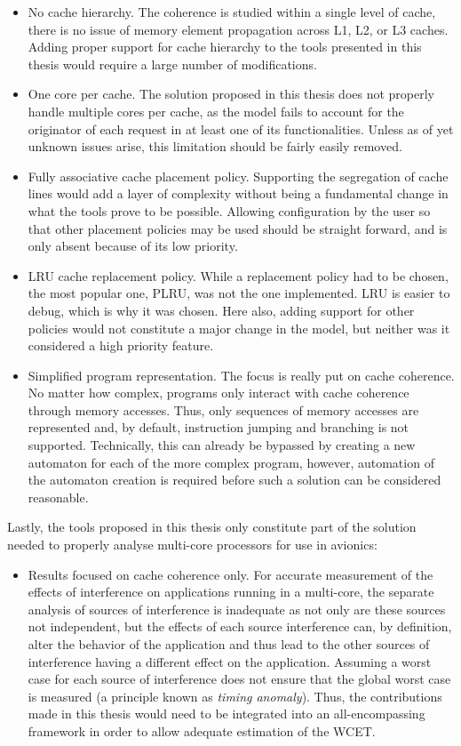 \begin{itemize}
\item No cache hierarchy. The coherence is studied within a single level of
cache, there is no issue of memory element propagation across L1, L2, or L3
caches. Adding proper support for cache hierarchy to the tools presented in this
thesis would require a large number of modifications.
\item One core per cache. The solution proposed in this thesis does not properly
handle multiple cores per cache, as the model fails to account for the
originator of each request in at least one of its functionalities. Unless as of
yet unknown issues arise, this limitation should be fairly easily removed.
\item Fully associative cache placement policy. Supporting the segregation of
cache lines would add a layer of complexity without being a fundamental change
in what the tools prove to be possible. Allowing configuration by the user so
that other placement policies may be used should be straight forward, and is
only absent because of its low priority.
\item LRU cache replacement policy. While a replacement policy had to be chosen,
the most popular one, PLRU, was not the one implemented. LRU is easier to
debug, which is why it was chosen. Here also, adding support for other policies
would not constitute a major change in the model, but neither was it considered
a high priority feature.
\item Simplified program representation. The focus is really put on cache
coherence. No matter how complex, programs only interact with cache coherence
through memory accesses. Thus, only sequences of memory accesses are represented
and, by default, instruction jumping and branching is not supported.
Technically, this can already be bypassed by creating a new automaton for each
of the more complex program, however, automation of the automaton creation is
required before such a solution can be considered reasonable.
\end{itemize}

Lastly, the tools proposed in this thesis only constitute part of the solution
needed to properly analyse multi-core processors for use in avionics:
\begin{itemize}
\item Results focused on cache coherence only. For accurate measurement of the
effects of interference on applications running in a multi-core, the separate
analysis of sources of interference is inadequate as not only are these sources
not independent, but the effects of each source interference can, by definition,
alter the behavior of the application and thus lead to the other sources of
interference having a different effect on the application. Assuming a worst case
for each source of interference does not ensure that the global worst case is
measured (a principle known as \textit{timing anomaly}). Thus, the contributions
made in this thesis would need to be integrated into an all-encompassing
framework in order to allow adequate estimation of the WCET.
\end{itemize}

